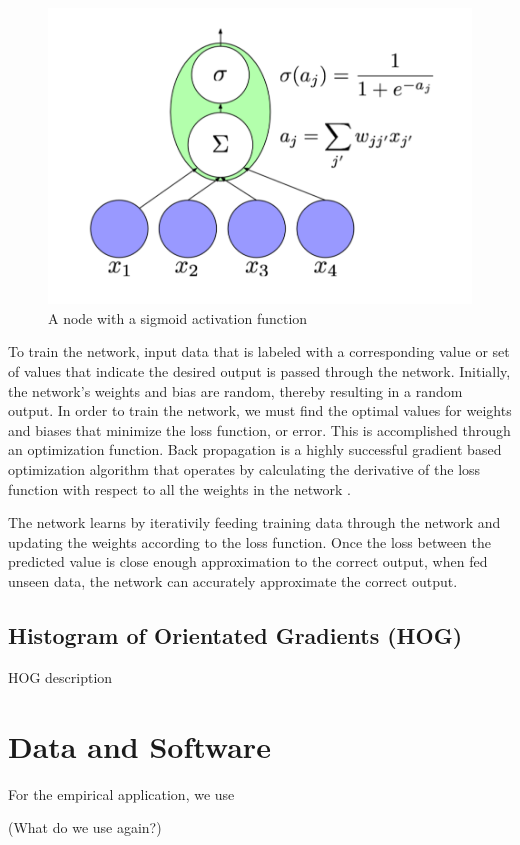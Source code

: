 \documentclass[%
 aip,
 jmp,%
 amsmath,amssymb,
 reprint,%
]{revtex4-1}
\begin{document}
\begin{figure}
\centering
\includegraphics[width=0.7\linewidth]{node.png}
\caption{A node with a sigmoid activation function}
\label{fig:node}
\end{figure}


To train the network, input data that is labeled with a corresponding value or set of values that indicate the desired output is passed through the network. Initially, the network's weights and bias are random, thereby resulting in a random output. In order to train the network, we must find the optimal values for weights and biases that minimize the loss function, or error. This is accomplished through an optimization function. Back propagation is a highly successful gradient based optimization algorithm that operates by calculating the derivative of the loss function with respect to all the weights in the network \cite{LSTM2}.


The network learns by iterativily feeding training data through the network and updating the weights according to the loss function. Once the loss between the predicted value is close enough approximation to the correct output, when fed unseen data, the network can accurately approximate the correct output. 

\subsection{\label{sec:level2}Histogram of Orientated Gradients (HOG)}

HOG description

\section{Data and Software}

For the empirical application, we use 

(What do we use again?)
\end{document}
